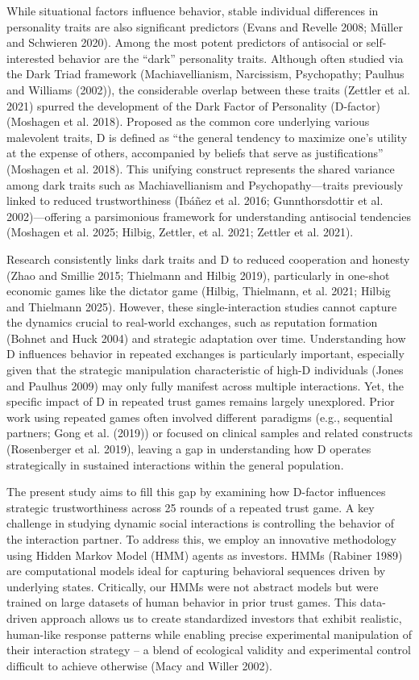 \documentclass[
]{article}
\begin{document}
While situational factors influence behavior, stable individual differences in personality traits are also significant predictors (Evans and Revelle 2008; Müller and Schwieren 2020).
Among the most potent predictors of antisocial or self-interested behavior are the ``dark'' personality traits.
Although often studied via the Dark Triad framework (Machiavellianism, Narcissism, Psychopathy; Paulhus and Williams (2002)), the considerable overlap between these traits (Zettler et al. 2021) spurred the development of the Dark Factor of Personality (D-factor) (Moshagen et al. 2018).
Proposed as the common core underlying various malevolent traits, D is defined as ``the general tendency to maximize one's utility at the expense of others, accompanied by beliefs that serve as justifications'' (Moshagen et al. 2018).
This unifying construct represents the shared variance among dark traits such as Machiavellianism and Psychopathy---traits previously linked to reduced trustworthiness (Ibáñez et al. 2016; Gunnthorsdottir et al. 2002)---offering a parsimonious framework for understanding antisocial tendencies (Moshagen et al. 2025; Hilbig, Zettler, et al. 2021; Zettler et al. 2021).

Research consistently links dark traits and D to reduced cooperation and honesty (Zhao and Smillie 2015; Thielmann and Hilbig 2019), particularly in one-shot economic games like the dictator game (Hilbig, Thielmann, et al. 2021; Hilbig and Thielmann 2025).
However, these single-interaction studies cannot capture the dynamics crucial to real-world exchanges, such as reputation formation (Bohnet and Huck 2004) and strategic adaptation over time.
Understanding how D influences behavior in repeated exchanges is particularly important, especially given that the strategic manipulation characteristic of high-D individuals (Jones and Paulhus 2009) may only fully manifest across multiple interactions.
Yet, the specific impact of D in repeated trust games remains largely unexplored.
Prior work using repeated games often involved different paradigms (e.g., sequential partners; Gong et al. (2019)) or focused on clinical samples and related constructs (Rosenberger et al. 2019), leaving a gap in understanding how D operates strategically in sustained interactions within the general population.

The present study aims to fill this gap by examining how D-factor influences strategic trustworthiness across 25 rounds of a repeated trust game.
A key challenge in studying dynamic social interactions is controlling the behavior of the interaction partner.
To address this, we employ an innovative methodology using Hidden Markov Model (HMM) agents as investors.
HMMs (Rabiner 1989) are computational models ideal for capturing behavioral sequences driven by underlying states.
Critically, our HMMs were not abstract models but were trained on large datasets of human behavior in prior trust games.
This data-driven approach allows us to create standardized investors that exhibit realistic, human-like response patterns while enabling precise experimental manipulation of their interaction strategy -- a blend of ecological validity and experimental control difficult to achieve otherwise (Macy and Willer 2002).
\end{document}
